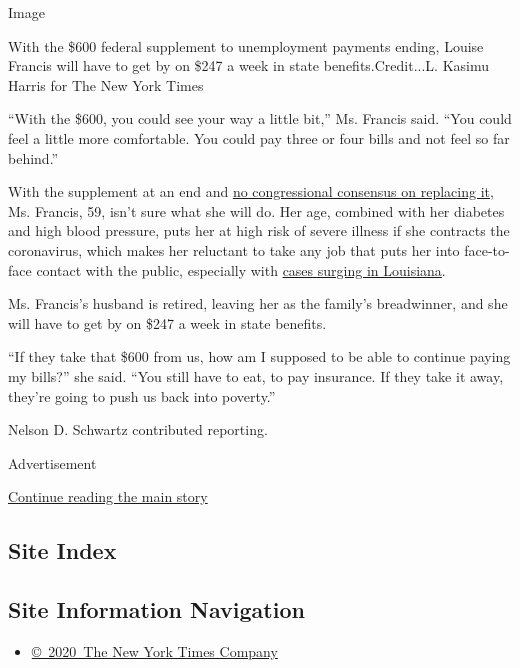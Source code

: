 Image

With the \$600 federal supplement to unemployment payments ending,
Louise Francis will have to get by on \$247 a week in state
benefits.Credit...L. Kasimu Harris for The New York Times

``With the \$600, you could see your way a little bit,'' Ms. Francis
said. ``You could feel a little more comfortable. You could pay three or
four bills and not feel so far behind.''

With the supplement at an end and
\href{https://www.nytimes.com/2020/07/29/business/economy/unemployment-benefits-coronavirus.html}{no
congressional consensus on replacing it}, Ms. Francis, 59, isn't sure
what she will do. Her age, combined with her diabetes and high blood
pressure, puts her at high risk of severe illness if she contracts the
coronavirus, which makes her reluctant to take any job that puts her
into face-to-face contact with the public, especially with
\href{https://www.nytimes.com/interactive/2020/us/louisiana-coronavirus-cases.html}{cases
surging in Louisiana}.

Ms. Francis's husband is retired, leaving her as the family's
breadwinner, and she will have to get by on \$247 a week in state
benefits.

``If they take that \$600 from us, how am I supposed to be able to
continue paying my bills?'' she said. ``You still have to eat, to pay
insurance. If they take it away, they're going to push us back into
poverty.''

Nelson D. Schwartz contributed reporting.

Advertisement

\protect\hyperlink{after-bottom}{Continue reading the main story}

\hypertarget{site-index}{%
\subsection{Site Index}\label{site-index}}

\hypertarget{site-information-navigation}{%
\subsection{Site Information
Navigation}\label{site-information-navigation}}

\begin{itemize}
\tightlist
\item
  \href{https://help.nytimes.com/hc/en-us/articles/115014792127-Copyright-notice}{©~2020~The
  New York Times Company}
\end{itemize}

